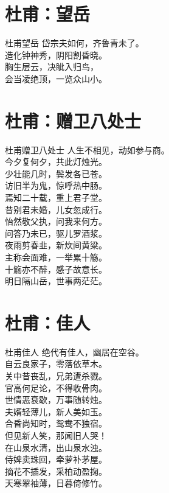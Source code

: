 \documentclass[12pt,oneside,a5paper]{book}
\begin{document}
\chapter{杜甫：望岳}
\begin{poemzh}{杜甫}{望岳}
岱宗夫如何，齐鲁青未了。\\
造化钟神秀，阴阳割昏晓。\\
胸生层云，决眦入归鸟，\\
会当凌绝顶，一览众山小。\\ 
\end{poemzh}


\chapter{杜甫：赠卫八处士}
\begin{poemzh}{杜甫}{赠卫八处士}
人生不相见，动如参与商。\\
今夕复何夕，共此灯烛光。\\
少壮能几时，鬓发各已苍。\\
访旧半为鬼，惊呼热中肠。\\
焉知二十载，重上君子堂。\\
昔别君未婚，儿女忽成行。\\
怡然敬父执，问我来何方。\\
问答乃未已，驱儿罗酒浆。\\
夜雨剪春韭，新炊间黄粱。\\
主称会面难，一举累十觞。\\
十觞亦不醉，感子故意长。\\
明日隔山岳，世事两茫茫。\\ 
\end{poemzh}


\chapter{杜甫：佳人}
\begin{poemzh}{杜甫}{佳人}
绝代有佳人，幽居在空谷。\\
自云良家子，零落依草木。\\
关中昔丧乱，兄弟遭杀戮。\\
官高何足论，不得收骨肉。\\
世情恶衰歇，万事随转烛。\\
夫婿轻薄儿，新人美如玉。\\
合昏尚知时，鸳鸯不独宿。\\
但见新人笑，那闻旧人哭！\\
在山泉水清，出山泉水浊。\\
侍婢卖珠回，牵萝补茅屋。\\
摘花不插发，采柏动盈掬。\\
天寒翠袖薄，日暮倚修竹。\\ 
\end{poemzh}
\end{document}
